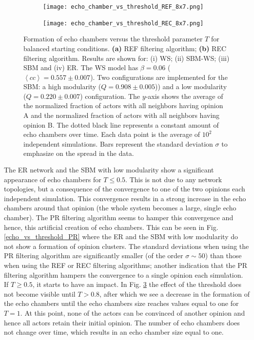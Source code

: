 \documentclass[11 pt , letterpaper , twoside , openright]{book}
\begin{document}
\begin{figure}[H]
  \begin{subfigure}[b]{0.49\textwidth}
    \caption{}
  	\texttt{[image: echo\_chamber\_vs\_threshold\_REF\_8x7.png]}
    \label{REF_thres}
  \end{subfigure}
  \begin{subfigure}[b]{0.49\textwidth}
    \caption{}
  	\texttt{[image: echo\_chamber\_vs\_threshold\_REC\_8x7.png]}
    \label{REC_thres}
  \end{subfigure}
  \captionsetup{format=plain}
  \caption[Formation of echo chambers versus the threshold parameter $T$ for balanced starting conditions. The REF and REC filtering algorithms are used and the majority threshold model is implemented.]{Formation of echo chambers versus the threshold parameter $T$ for balanced starting conditions. \textbf{(a)} REF filtering algorithm; \textbf{(b)} REC filtering algorithm. Results are shown for: (i) WS; (ii) SBM-WS; (iii) SBM and (iv) ER. The WS model has $\beta = 0.06$ ($\left<cc\right> = 0.557 \pm 0.007$). Two configurations are implemented for the SBM: a high modularity ($Q = 0.908 \pm 0.005$)) and a low modularity ($Q = 0.220 \pm 0.007$) configuration. The $y$-axis shows the average of the normalized fraction of actors with all neighbors having opinion A and the normalized fraction of actors with all neighbors having opinion B. The dotted black line represents a constant amount of echo chambers over time. Each data point is the average of $10^2$ independent simulations. Bars represent the standard deviation $\sigma$ to emphasize on the spread in the data.}
\label{echo_vs_threshold_REF-REC}
\end{figure}
\noindent
The ER network and the SBM with low modularity show a significant appearance of echo chambers for $T \leqslant 0.5$. This is not due to any network topologies, but a consequence of the convergence to one of the two opinions each independent simulation. This convergence results in a strong increase in the echo chambers around that opinion (the whole system becomes a large, single echo chamber). The PR filtering algorithm seems to hamper this convergence and hence, this artificial creation of echo chambers. This can be seen in Fig. \ref{echo_vs_threshold_PR} where the ER and the SBM with low modularity do not show a formation of opinion clusters. The standard deviations when using the PR filtering algorithm are significantly smaller (of the order $\sigma \sim 50$) than those when using the REF or REC filtering algorithms; another indication that the PR filtering algorithm hampers the convergence to a single opinion each simulation. If $T \geqslant 0.5$, it starts to have an impact. In Fig. \ref{echo_vs_threshold_REF-REC} the effect of the threshold does not become visible until $T > 0.8$, after which we see a decrease in the formation of the echo chambers until the echo chambers size reaches values equal to one for $T=1$. At this point, none of the actors can be convinced of another opinion and hence all actors retain their initial opinion. The number of echo chambers does not change over time, which results in an echo chamber size equal to one.
\end{document}

